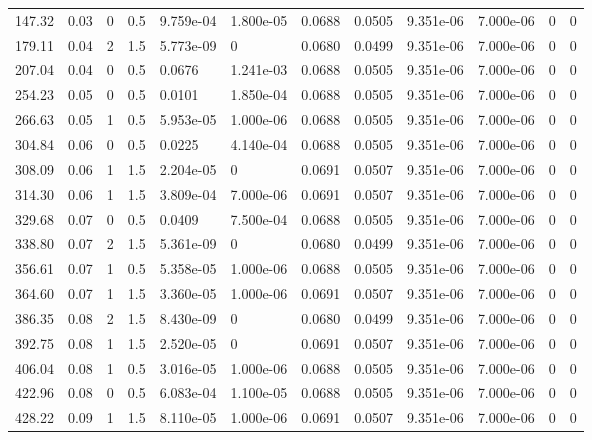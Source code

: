 \documentclass[preview]{standalone}
\begin{document}
{{\begin{tabular}{L{1.2cm}C{1.2cm} C{0.3cm}C{0.5cm} C{1.4cm}C{1.4cm} C{1.4cm}C{1.4cm} C{1.6cm}C{1.6cm} C{1.6cm}C{1.6cm}}
  147.32  &  0.03  & 0     & 0.5 &  9.759e-04  & 1.800e-05  &  0.0688&   0.0505& 9.351e-06 & 7.000e-06   &  0 & 0  \\ 
  179.11  &  0.04  & 2     & 1.5 &  5.773e-09  & 0  &  0.0680&   0.0499& 9.351e-06 & 7.000e-06   &  0 & 0  \\ 
  207.04  &  0.04  & 0     & 0.5 &  0.0676  & 1.241e-03  &  0.0688&   0.0505& 9.351e-06 & 7.000e-06   &  0 & 0  \\ 
  254.23  &  0.05  & 0     & 0.5 &  0.0101  & 1.850e-04  &  0.0688&   0.0505& 9.351e-06 & 7.000e-06   &  0 & 0  \\ 
  266.63  &  0.05  & 1     & 0.5 &  5.953e-05  & 1.000e-06  &  0.0688&   0.0505& 9.351e-06 & 7.000e-06   &  0 & 0  \\ 
  304.84  &  0.06  & 0     & 0.5 &  0.0225  & 4.140e-04  &  0.0688&   0.0505& 9.351e-06 & 7.000e-06   &  0 & 0  \\ 
  308.09  &  0.06  & 1     & 1.5 &  2.204e-05  & 0  &  0.0691&   0.0507& 9.351e-06 & 7.000e-06   &  0 & 0  \\ 
  314.30  &  0.06  & 1     & 1.5 &  3.809e-04  & 7.000e-06  &  0.0691&   0.0507& 9.351e-06 & 7.000e-06   &  0 & 0  \\ 
  329.68  &  0.07  & 0     & 0.5 &  0.0409  & 7.500e-04  &  0.0688&   0.0505& 9.351e-06 & 7.000e-06   &  0 & 0  \\ 
  338.80  &  0.07  & 2     & 1.5 &  5.361e-09  & 0  &  0.0680&   0.0499& 9.351e-06 & 7.000e-06   &  0 & 0  \\ 
  356.61  &  0.07  & 1     & 0.5 &  5.358e-05  & 1.000e-06  &  0.0688&   0.0505& 9.351e-06 & 7.000e-06   &  0 & 0  \\ 
  364.60  &  0.07  & 1     & 1.5 &  3.360e-05  & 1.000e-06  &  0.0691&   0.0507& 9.351e-06 & 7.000e-06   &  0 & 0  \\ 
  386.35  &  0.08  & 2     & 1.5 &  8.430e-09  & 0  &  0.0680&   0.0499& 9.351e-06 & 7.000e-06   &  0 & 0  \\ 
  392.75  &  0.08  & 1     & 1.5 &  2.520e-05  & 0  &  0.0691&   0.0507& 9.351e-06 & 7.000e-06   &  0 & 0  \\ 
  406.04  &  0.08  & 1     & 0.5 &  3.016e-05  & 1.000e-06  &  0.0688&   0.0505& 9.351e-06 & 7.000e-06   &  0 & 0  \\ 
  422.96  &  0.08  & 0     & 0.5 &  6.083e-04  & 1.100e-05  &  0.0688&   0.0505& 9.351e-06 & 7.000e-06   &  0 & 0  \\ 
  428.22  &  0.09  & 1     & 1.5 &  8.110e-05  & 1.000e-06  &  0.0691&   0.0507& 9.351e-06 & 7.000e-06   &  0 & 0  \\ 

\end{tabular}}}
\end{document}
